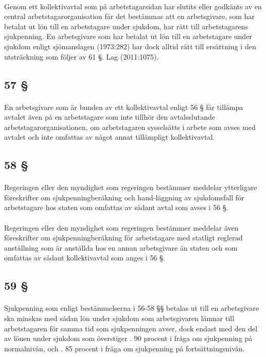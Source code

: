 \documentclass[a4paper,notitlepage,openany,10pt]{book}
\begin{document}
\paragraph*{}
Genom ett kollektivavtal som på arbetstagarsidan har slutits eller godkänts av en central arbetstagarorganisation får det bestämmas att en arbetsgivare, som har betalat ut lön till en arbetstagare under sjukdom, har rätt till arbetstagarens sjukpenning. En arbetsgivare som har betalat ut lön till en arbetstagare under sjukdom enligt sjömanslagen (1973:282) har dock alltid rätt till ersättning i den utsträckning som följer av 61 §.
Lag (2011:1075).
\subsection*{57 §}
\paragraph*{}
En arbetsgivare som är bunden av ett kollektivavtal enligt 56 § får tillämpa avtalet även på en arbetstagare som inte tillhör den avtalsslutande arbetstagarorganisationen, om arbetstagaren sysselsätts i arbete som avses med avtalet och inte omfattas av något annat tillämpligt kollektivavtal.
\subsection*{58 §}
\paragraph*{}
Regeringen eller den myndighet som regeringen bestämmer meddelar ytterligare föreskrifter om sjukpenningberäkning och hand-läggning av sjukdomsfall för arbetstagare hos staten som omfattas av sådant avtal som avses i 56 §.
\paragraph*{}
Regeringen eller den myndighet som regeringen bestämmer meddelar även föreskrifter om sjukpenningberäkning för arbetstagare med statligt reglerad anställning som är anställda hos en annan arbetsgivare än staten och som omfattas av sådant kollektivavtal som anges i 56 §.
\subsection*{59 §}
\paragraph*{}
Sjukpenning som enligt bestämmelserna i 56-58 §§ betalas ut till en arbetsgivare ska minskas med sådan lön under sjukdom som arbetsgivaren lämnar till arbetstagaren för samma tid som sjukpenningen avser, dock endast med den del av lönen under sjukdom som överstiger
. 90 procent i fråga om sjukpenning på normalnivån, och
. 85 procent i fråga om sjukpenning på fortsättningsnivån.
\end{document}

